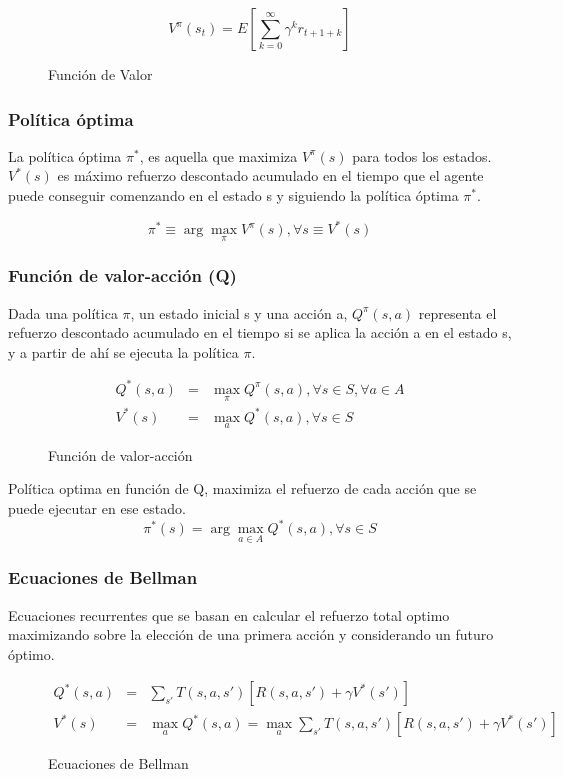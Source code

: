\documentclass[12pt]{report} %
\begin{document}
\begin{figure}[H]
  $$V^\pi(s_t)=E \left[ \sum ^\infty _{k=0} \gamma^k r_{t+1+k} \right]$$
  \captionsetup{justification=centering}
  \caption{Función de Valor}
\end{figure}

\subsubsection{Política óptima}
La política óptima $\pi^*$, es aquella que maximiza $V^\pi (s)$ para todos los estados. $V^* (s)$ es máximo refuerzo descontado acumulado en el tiempo que el agente puede conseguir comenzando en el estado s y siguiendo la política óptima $\pi^*$.

$$\pi ^* \equiv \arg \max_\pi V^\pi (s), \forall s \equiv V^* (s)$$


\subsubsection{Función de valor-acción (Q)}
Dada una política $\pi$, un estado inicial s y una acción a, $Q^\pi (s, a)$ representa el refuerzo descontado acumulado en el tiempo si se aplica la acción a en el estado s, y a partir de ahí se ejecuta la política $\pi$.

\begin{figure}[H]
  \begin{eqnarray*}
    Q^* (s, a) &=& \max_\pi Q^\pi (s,a), \forall s \in S, \forall a \in A \\
    V^* (s) &=& \max_a Q^* (s,a), \forall s \in S
  \end{eqnarray*} 
  \captionsetup{justification=centering}
  \caption{Función de valor-acción}
\end{figure}

Política optima en función de Q, maximiza el refuerzo de cada acción que se puede ejecutar en ese estado.
$$\pi^* (s) = \arg \max_{a \in A} Q^* (s,a), \forall s \in S$$
\pagebreak
\subsubsection{Ecuaciones de Bellman}
Ecuaciones recurrentes que se basan en calcular el refuerzo total optimo maximizando sobre la elección de una primera acción y considerando un futuro óptimo.
\begin{figure}[H]
  \begin{eqnarray*}
    Q^* (s, a) &=& \sum _{s'} T(s,a, s') [R(s,a,s') + \gamma V^* (s')]\\
    V^* (s) &=& \max_a Q^*(s,a) = \max _a \sum _{s'} T(s,a, s') [R(s,a,s') + \gamma V^* (s')]
  \end{eqnarray*} 
  \captionsetup{justification=centering}
  \caption{Ecuaciones de Bellman}
\end{figure}
\end{document}

